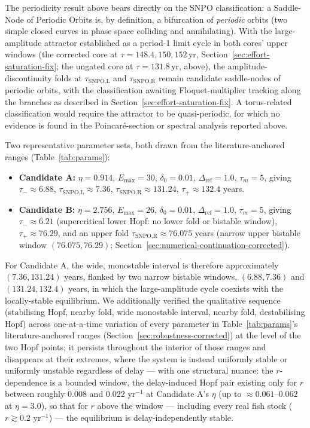 \documentclass[twocolumn,10pt]{article}
\begin{document}
The periodicity result above bears directly on the SNPO classification: a Saddle-Node of Periodic Orbits is, by definition, a bifurcation of \emph{periodic} orbits (two simple closed curves in phase space colliding and annihilating). With the large-amplitude attractor established as a period-1 limit cycle in both cores' upper windows (the corrected core at $\tau=148.4,150,152$\,yr, Section~\ref{sec:effort-saturation-fix}; the ungated core at $\tau=131.8$\,yr, above), the amplitude-discontinuity folds at $\tau_{\text{SNPO,L}}$ and $\tau_{\text{SNPO,R}}$ remain candidate saddle-nodes of periodic orbits, with the classification awaiting Floquet-multiplier tracking along the branches as described in Section~\ref{sec:effort-saturation-fix}. A torus-related classification would require the attractor to be quasi-periodic, for which no evidence is found in the Poincar\'e-section or spectral analysis reported above.

Two representative parameter sets, both drawn from the literature-anchored ranges (Table~\ref{tab:params}):
\begin{itemize}
\item \textbf{Candidate A:} \(\eta = 0.914\), \(E_{\max} = 30\), \(\delta_0 = 0.01\), \(\Delta_{\text{ref}} = 1.0\), \(\tau_m = 5\), giving $\tau_-\approx6.88$, $\tau_{\text{SNPO,L}}\approx7.36$, $\tau_{\text{SNPO,R}}\approx131.24$, $\tau_+\approx132.4$ years.
\item \textbf{Candidate B:} \(\eta = 2.756\), \(E_{\max} = 26\), \(\delta_0 = 0.01\), \(\Delta_{\text{ref}} = 1.0\), \(\tau_m = 5\), giving $\tau_-\approx6.21$ (supercritical lower Hopf: no lower fold or bistable window), $\tau_+\approx76.29$, and an upper fold $\tau_{\text{SNPO,R}}\approx76.075$ years (narrow upper bistable window $(76.075,76.29)$; Section~\ref{sec:numerical-continuation-corrected}).
\end{itemize}
For Candidate A, the wide, monostable interval is therefore approximately $(7.36, 131.24)$ years, flanked by two narrow bistable windows, $(6.88,7.36)$ and $(131.24,132.4)$ years, in which the large-amplitude cycle coexists with the locally-stable equilibrium. We additionally verified the qualitative sequence (stabilising Hopf, nearby fold, wide monostable interval, nearby fold, destabilising Hopf) across one-at-a-time variation of every parameter in Table~\ref{tab:params}'s literature-anchored ranges (Section~\ref{sec:robustness-corrected}) at the level of the two Hopf points; it persists throughout the interior of those ranges and disappears at their extremes, where the system is instead uniformly stable or uniformly unstable regardless of delay --- with one structural nuance: the $r$-dependence is a bounded window, the delay-induced Hopf pair existing only for $r$ between roughly $0.008$ and $0.022$ yr$^{-1}$ at Candidate A's $\eta$ (up to $\approx0.061$--$0.062$ at $\eta=3.0$), so that for $r$ above the window --- including every real fish stock ($r\gtrsim0.2$ yr$^{-1}$) --- the equilibrium is delay-independently stable.
\end{document}
